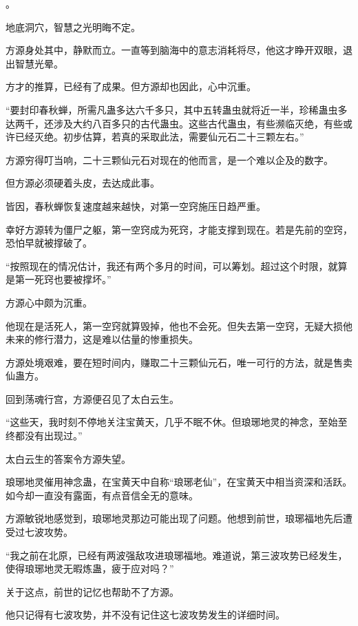 
\begin{this_body}

。

地底洞穴，智慧之光明晦不定。

方源身处其中，静默而立。一直等到脑海中的意志消耗将尽，他这才睁开双眼，退出智慧光晕。

方才的推算，已经有了成果。但方源却也因此，心中沉重。

“要封印春秋蝉，所需凡蛊多达六千多只，其中五转蛊虫就将近一半，珍稀蛊虫多达两千，还涉及大约八百多只的古代蛊虫。这些古代蛊虫，有些濒临灭绝，有些或许已经灭绝。初步估算，若真的采取此法，需要仙元石二十三颗左右。”

方源穷得叮当响，二十三颗仙元石对现在的他而言，是一个难以企及的数字。

但方源必须硬着头皮，去达成此事。

皆因，春秋蝉恢复速度越来越快，对第一空窍施压日趋严重。

幸好方源转为僵尸之躯，第一空窍成为死窍，才能支撑到现在。若是先前的空窍，恐怕早就被撑破了。

“按照现在的情况估计，我还有两个多月的时间，可以筹划。超过这个时限，就算是第一死窍也要被撑坏。”

方源心中颇为沉重。

他现在是活死人，第一空窍就算毁掉，他也不会死。但失去第一空窍，无疑大损他未来的修行潜力，这是难以估量的惨重损失。

方源处境艰难，要在短时间内，赚取二十三颗仙元石，唯一可行的方法，就是售卖仙蛊方。

回到荡魂行宫，方源便召见了太白云生。

“这些天，我时刻不停地关注宝黄天，几乎不眠不休。但琅琊地灵的神念，至始至终都没有出现过。”

太白云生的答案令方源失望。

琅琊地灵催用神念蛊，在宝黄天中自称“琅琊老仙”，在宝黄天中相当资深和活跃。如今却一直没有露面，有点音信全无的意味。

方源敏锐地感觉到，琅琊地灵那边可能出现了问题。他想到前世，琅琊福地先后遭受过七波攻势。

“我之前在北原，已经有两波强敌攻进琅琊福地。难道说，第三波攻势已经发生，使得琅琊地灵无暇炼蛊，疲于应对吗？”

关于这点，前世的记忆也帮助不了方源。

他只记得有七波攻势，并不没有记住这七波攻势发生的详细时间。


\end{this_body}
